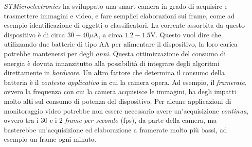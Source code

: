 \textit{STMicroelectronics} ha sviluppato una smart camera in grado di acquisire e trasmettere immagini e video, e fare semplici elaborazioni sui frame, come ad esempio identificazione di oggetti o classificatori.
La corrente assorbita da questo dispositivo \`e di circa $30-40 \mu \text{A}$, a circa $1.2-1.5 \text{V}$.
Questo vuol dire che, utilizzando due batterie di tipo AA per alimentare il dispositivo, la loro carica potrebbe mantenersi per degli \textit{anni}.
Questa ottimizzazione del consumo di energia \`e dovuta innanzitutto alla possibilit\`a di integrare degli algoritmi direttamente in \textit{hardware}.
Un altro fattore che determina il consumo della batteria \`e il \textit{contesto applicativo} in cui la camera opera.
Ad esempio, il \textit{framerate}, ovvero la frequenza con cui la camera acquisisce le immagini, ha degli impatti molto alti sul consumo di potenza del dispositivo.
Per alcune applicazioni di monitoraggio video potrebbe non essere necessario avere un'acquisizione \textit{continua}, ovvero tra i $30$ e i $2$ \textit{frame per secondo} (fps), da parte della camera, ma basterebbe un'acquisizione ed elaborazione a framerate molto pi\`u bassi, ad esempio un frame ogni minuto.\\
%
%
